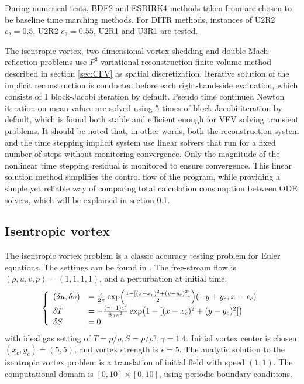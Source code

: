 During numerical tests,
BDF2 and ESDIRK4 methods taken from
\cite{bijl2002implicitBDFvESDIRK,kennedy2003additiveARK}
are chosen to be
baseline time marching methods.
For DITR methods, instances of
U2R2 $c_2 = 0.5$, U2R2 $c_2 = 0.55$, U2R1 and U3R1 are tested.

The isentropic vortex, two dimensional vortex shedding
and  double Mach reflection problems use
$P^3$ variational reconstruction finite volume method described in
section \ref{sec:CFV} as spatial  discretization.
Iterative solution of the implicit reconstruction
is conducted before each right-hand-side evaluation,
which consists of 1 block-Jacobi iteration by default.
Pseudo time continued Newton iteration on mean values are
solved using 5 times of block-Jacobi iteration by default,
which is found both stable and efficient enough for VFV solving
transient problems.
It should be noted that, in other words,
both the reconstruction system and
the time stepping implicit system use linear solvers that
run for a fixed number of steps without monitoring convergence.
Only the magnitude of the nonlinear time stepping residual
is monitored to ensure convergence.
This linear solution method simplifies the control flow of
the program,
while providing a simple yet reliable way of
comparing total calculation consumption between ODE solvers,
which will be explained in section \ref{ssec:resultIV}.



\subsection{Isentropic vortex}
\label{ssec:resultIV}

The isentropic vortex problem is a classic
accuracy testing problem for Euler equations.
The settings can be found in \cite{hu1999weighted_WENO}.
The free-stream flow is $(\rho,u,v,p)=(1,1,1,1)$,
and a perturbation at initial time:
\begin{equation}
    \left\{
    \begin{array}[2]{ll}
        (\delta u, \delta v) & = \frac{\epsilon}{2\pi}\exp(\frac{1-[(x-x_c)^2+(y-y_c)^2]}{2})(-y+y_c,x-x_c) \\
        \delta T             & = - \frac{(\gamma-1)\epsilon^2}{8\gamma\pi^2}\exp(1-[(x-x_c)^2+(y-y_c)^2])   \\
        \delta S             & = 0                                                                          \\
    \end{array}
    \right.
\end{equation}
with ideal gas setting of $T = p/\rho, S= p/\rho^\gamma, \gamma =1.4$.
Initial vortex center is chosen $(x_c,y_c)=(5,5)$,
and vortex strength is $\epsilon = 5$.
The analytic solution to the isentropic vortex problem is a
translation of initial field with speed $(1,1)$.
The computational domain is $[0,10]\times[0,10]$,
using periodic boundary conditions.


